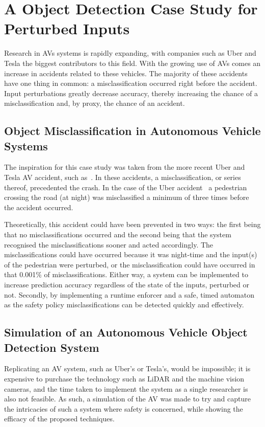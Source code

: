 \section{A Object Detection Case Study for Perturbed Inputs}
Research in \acfp{AV} systems is rapidly expanding, with companies such as Uber and Tesla the biggest contributors to this field.
With the growing use of \acp{AV} comes an increase in accidents related to these vehicles.
The majority of these accidents have one thing in common: a misclassification occurred right before the accident.
Input perturbations greatly decrease accuracy, thereby increasing the chance of a misclassification and, by proxy, the chance of an accident.


\subsection{Object Misclassification in Autonomous Vehicle Systems}
The inspiration for this case study was taken from the more recent Uber and Tesla \ac{AV} accident, such as~\cite{coldewey_2018}.
In these accidents, a misclassification, or series thereof, precedented the crash.
In the case of the Uber accident~\cite{coldewey_2018} a pedestrian crossing the road (at night) was misclassified a minimum of three times before the accident occurred.

Theoretically, this accident could have been prevented in two ways: the first being that no misclassifications occurred and the second being that the system recognised the misclassifications sooner and acted accordingly.
The misclassifications could have occurred because it was night-time and the input(s) of the pedestrian were perturbed, or the misclassification could have occurred in that 0.001\% of misclassifications. 
Either way, a system can be implemented to increase prediction accuracy regardless of the state of the inputs, perturbed or not.
Secondly, by implementing a runtime enforcer and a safe, timed automaton as the safety policy misclassifications can be detected quickly and effectively.


\subsection{Simulation of an Autonomous Vehicle Object Detection System}
Replicating an \ac{AV} system, such as Uber's or Tesla's, would be impossible; it is expensive to purchase the technology such as \ac{LiDAR} and the machine vision cameras, and the time taken to implement the system as a single researcher is also not feasible.
As such, a simulation of the \ac{AV} was made to try and capture the intricacies of such a system where safety is concerned, while showing the efficacy of the proposed techniques.


